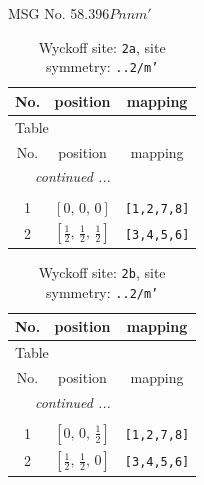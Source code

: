 \documentclass[fleqn,8pt]{jsarticle}
\begin{document}
\setcounter{MaxMatrixCols}{32}

\renewcommand{\tablename}{Table~}
\renewcommand{\figurename}{Figure~}
\begin{center}
\LARGE
MSG No. 58.396\quad$Pnnm'$
\end{center}
\renewcommand{\arraystretch}{1.2}
\begin{longtable}{ccc}
\caption{Wyckoff site: {\tt 2a}, site symmetry: {\tt ..2/m'}}
 \\
 \hline \hline
No. & position & mapping \\ \hline \endfirsthead

\multicolumn{2}{l}{\tablename\ \thetable{}} \\
 \hline \hline
No. & position & mapping \\ \hline \endhead

 \hline \hline
\multicolumn{2}{r}{\footnotesize\it continued ...} \\ \endfoot

 \hline \hline
\multicolumn{2}{r}{} \\ \endlastfoot

1 & $\left[ 0,\, 0,\, 0 \right]$ & {\tt [1,2,7,8]} \\ \hline
2 & $\left[ \frac{1}{2},\, \frac{1}{2},\, \frac{1}{2} \right]$ & {\tt [3,4,5,6]} \\
\end{longtable}
\renewcommand{\arraystretch}{1.2}
\begin{longtable}{ccc}
\caption{Wyckoff site: {\tt 2b}, site symmetry: {\tt ..2/m'}}
 \\
 \hline \hline
No. & position & mapping \\ \hline \endfirsthead

\multicolumn{2}{l}{\tablename\ \thetable{}} \\
 \hline \hline
No. & position & mapping \\ \hline \endhead

 \hline \hline
\multicolumn{2}{r}{\footnotesize\it continued ...} \\ \endfoot

 \hline \hline
\multicolumn{2}{r}{} \\ \endlastfoot

1 & $\left[ 0,\, 0,\, \frac{1}{2} \right]$ & {\tt [1,2,7,8]} \\ \hline
2 & $\left[ \frac{1}{2},\, \frac{1}{2},\, 0 \right]$ & {\tt [3,4,5,6]} \\
\end{longtable}
\end{document}
